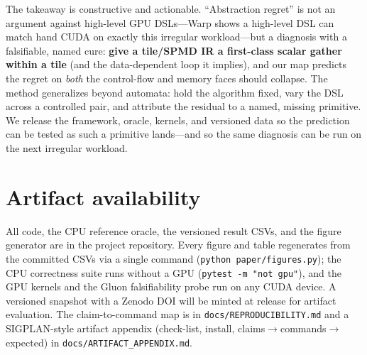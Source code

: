 \documentclass[conference]{IEEEtran}
\begin{document}
The takeaway is constructive and actionable. ``Abstraction regret'' is not an argument against
high-level GPU DSLs---Warp shows a high-level DSL can match hand CUDA on exactly this irregular
workload---but a diagnosis with a falsifiable, named cure: \textbf{give a tile/SPMD IR a
first-class scalar gather within a tile} (and the data-dependent loop it implies), and our map
predicts the regret on \emph{both} the control-flow and memory faces should collapse. The method
generalizes beyond automata: hold the algorithm fixed, vary the DSL across a controlled pair, and
attribute the residual to a named, missing primitive. We release the framework, oracle, kernels,
and versioned data so the prediction can be tested as such a primitive lands---and so the same
diagnosis can be run on the next irregular workload.

\section*{Artifact availability}
All code, the CPU reference oracle, the versioned result CSVs, and the figure generator are
in the project repository. Every figure and table regenerates from the committed CSVs via a
single command (\texttt{python paper/figures.py}); the CPU correctness suite runs without a
GPU (\texttt{pytest -m "not gpu"}), and the GPU kernels and the Gluon falsifiability probe run
on any CUDA device. A versioned snapshot with a Zenodo DOI will be minted at release for
artifact evaluation. The claim-to-command map is in \texttt{docs/REPRODUCIBILITY.md} and a
SIGPLAN-style artifact appendix (check-list, install, claims$\to$commands$\to$expected) in
\texttt{docs/ARTIFACT\_APPENDIX.md}.
\end{document}
